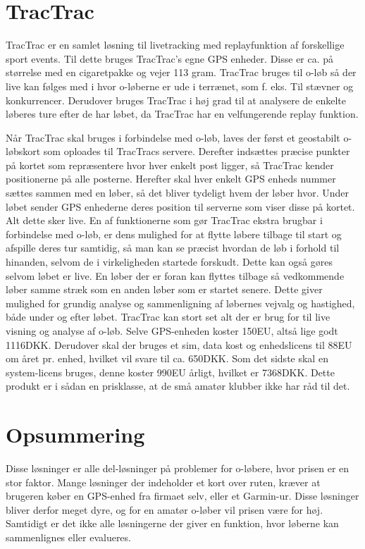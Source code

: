 \section{TracTrac}
TracTrac er en samlet løsning til livetracking med replayfunktion af forskellige sport events. Til dette bruges TracTrac's egne GPS enheder. Disse er ca. på størrelse med en cigaretpakke og vejer 113 gram.\newline
TracTrac bruges til o-løb så der live kan følges med i hvor o-løberne er ude i terrænet, som f. eks. Til stævner og konkurrencer. Derudover bruges TracTrac i høj grad til at analysere de enkelte løberes ture efter de har løbet, da TracTrac har en velfungerende replay funktion. 

Når TracTrac skal bruges i forbindelse med o-løb, laves der først et geostabilt o-løbskort som oploades til TracTracs servere. Derefter indsættes præcise punkter på kortet som repræsentere hvor hver enkelt post ligger, så TracTrac kender positionerne på alle posterne. Herefter skal hver enkelt GPS enheds nummer sættes sammen med en løber, så det bliver tydeligt hvem der løber hvor. Under løbet sender GPS enhederne deres position til serverne som viser disse på kortet. Alt dette sker live. En af funktionerne som gør TracTrac ekstra brugbar i forbindelse med o-løb, er dens mulighed for at flytte løbere tilbage til start og afspille deres tur samtidig, så man kan se præcist hvordan de løb i forhold til hinanden, selvom de i virkeligheden startede forskudt. Dette kan også gøres selvom løbet er live. En løber der er foran kan flyttes tilbage så vedkommende løber samme stræk som en anden løber som er startet senere. Dette giver mulighed for grundig analyse og sammenligning af løbernes vejvalg og hastighed, både under og efter løbet.\newline
TracTrac kan stort set alt der er brug for til live visning og analyse af o-løb. Selve GPS-enheden koster 150EU, altså lige godt 1116DKK. Derudover skal der bruges et sim, data kost og enhedslicens til 88EU om året pr. enhed, hvilket vil svare til ca. 650DKK. Som det sidste skal en system-licens bruges, denne koster 990EU årligt, hvilket er 7368DKK. Dette produkt er i sådan en prisklasse, at de små amatør klubber ikke har råd til det. \citep{TTC}


\section{Opsummering}
Disse løsninger er alle del-løsninger på problemer for o-løbere, hvor prisen er en stor faktor. Mange løsninger der indeholder et kort over ruten, kræver at brugeren køber en GPS-enhed fra firmaet selv, eller et Garmin-ur. Disse løsninger bliver derfor meget dyre, og for en amatør o-løber vil prisen være for høj. Samtidigt er det ikke alle løsningerne der giver en funktion, hvor løberne kan sammenlignes eller evalueres.

